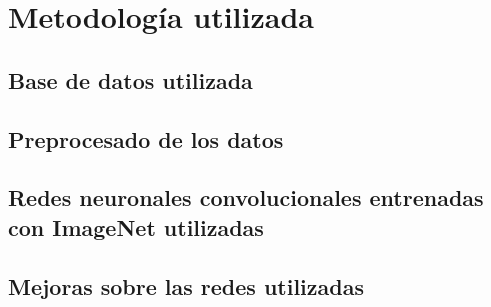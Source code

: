 \section{Metodología utilizada}


\subsection{Base de datos utilizada}


\subsection{Preprocesado de los datos}


\subsection{Redes neuronales convolucionales entrenadas con ImageNet utilizadas}

\subsection{Mejoras sobre las redes utilizadas}
